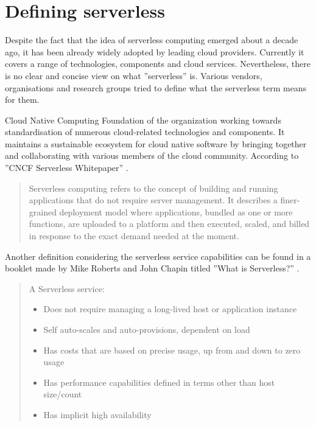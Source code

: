 \section{Defining serverless}

Despite the fact that the idea of serverless computing emerged about a decade ago, it has been already widely adopted by leading cloud providers. Currently it covers a range of technologies, components and cloud services. Nevertheless, there is no clear and concise view on what ''serverless'' is. Various vendors, organisations and research groups tried to define what the serverless term means for them.

Cloud Native Computing Foundation of the organization working towards standardisation of numerous cloud-related technologies and components. It maintains a sustainable ecosystem for cloud native software by bringing together and collaborating with various members of the cloud community. According to ''CNCF Serverless Whitepaper'' \cite{CNCFServerless}.

\begin{quotation}
Serverless computing refers to the concept of building and running applications that do not require server management. It describes a finer-grained deployment model where applications, bundled as one or more functions, are uploaded to a platform and then executed, scaled, and billed in response to the exact demand needed at the moment.
\end{quotation}

Another definition considering the serverless service capabilities can be found in a booklet made by Mike Roberts and John Chapin titled ''What is Serverless?'' \cite{RobertsChapin2017}.

\begin{quotation}
\noindent A Serverless service:
\begin{itemize}
    \item Does not require managing a long-lived host or application instance
    \item Self auto-scales and auto-provisions, dependent on load
    \item Has costs that are based on precise usage, up from and down to zero usage
    \item Has performance capabilities defined in terms other than host size/count
    \item Has implicit high availability
\end{itemize}
\end{quotation}

